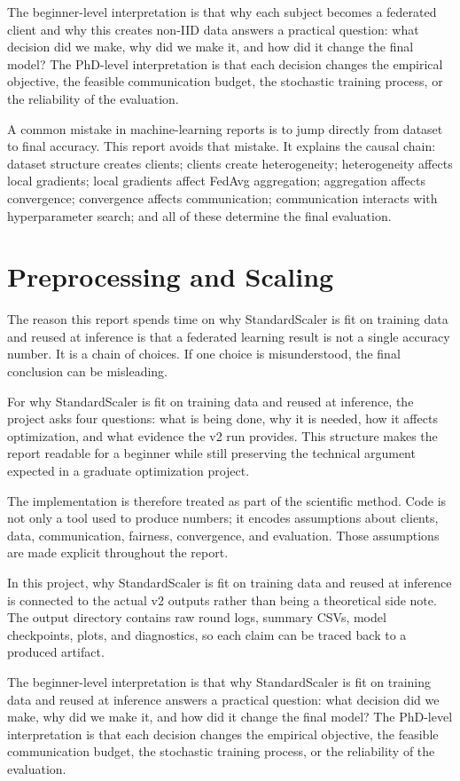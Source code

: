 \documentclass[11pt]{report}
\begin{document}
The beginner-level interpretation is that why each subject becomes a federated client and why this
creates non-IID data answers a practical question: what decision did we make, why did we make it,
and how did it change the final model? The PhD-level interpretation is that each decision changes
the empirical objective, the feasible communication budget, the stochastic training process, or the
reliability of the evaluation.

A common mistake in machine-learning reports is to jump directly from dataset to final accuracy.
This report avoids that mistake. It explains the causal chain: dataset structure creates clients;
clients create heterogeneity; heterogeneity affects local gradients; local gradients affect FedAvg
aggregation; aggregation affects convergence; convergence affects communication; communication
interacts with hyperparameter search; and all of these determine the final evaluation.

\chapter{Preprocessing and Scaling}
The reason this report spends time on why StandardScaler is fit on training data and reused at
inference is that a federated learning result is not a single accuracy number. It is a chain of
choices. If one choice is misunderstood, the final conclusion can be misleading.

For why StandardScaler is fit on training data and reused at inference, the project asks four
questions: what is being done, why it is needed, how it affects optimization, and what evidence the
v2 run provides. This structure makes the report readable for a beginner while still preserving the
technical argument expected in a graduate optimization project.

The implementation is therefore treated as part of the scientific method. Code is not only a tool
used to produce numbers; it encodes assumptions about clients, data, communication, fairness,
convergence, and evaluation. Those assumptions are made explicit throughout the report.

In this project, why StandardScaler is fit on training data and reused at inference is connected to
the actual v2 outputs rather than being a theoretical side note. The output directory contains raw
round logs, summary CSVs, model checkpoints, plots, and diagnostics, so each claim can be traced
back to a produced artifact.

The beginner-level interpretation is that why StandardScaler is fit on training data and reused at
inference answers a practical question: what decision did we make, why did we make it, and how did
it change the final model? The PhD-level interpretation is that each decision changes the empirical
objective, the feasible communication budget, the stochastic training process, or the reliability of
the evaluation.
\end{document}
